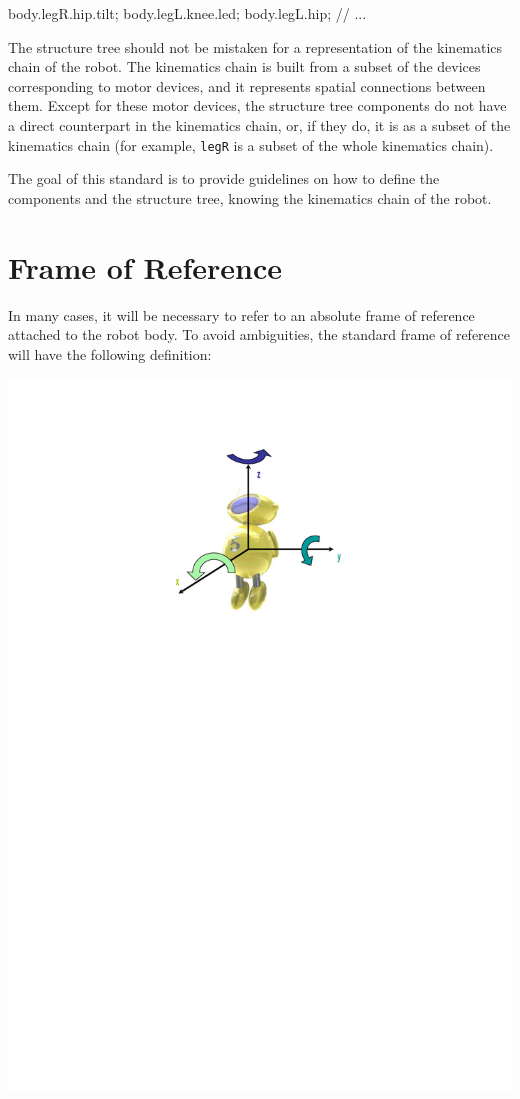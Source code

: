 \begin{urbifixme}
body.legR.hip.tilt;
body.legL.knee.led;
body.legL.hip;
// ...
\end{urbifixme}


The structure tree should not be mistaken for a representation of the
kinematics chain of the robot. The kinematics chain is built from a
subset of the devices corresponding to motor devices, and it represents
spatial connections between them. Except for these motor devices, the
structure tree components do not have a direct counterpart in the
kinematics chain, or, if they do, it is as a subset of the kinematics
chain (for example, \texttt{legR} is a subset of the whole kinematics
chain).


The goal of this standard is to provide guidelines on how to define the
components and the structure tree, knowing the kinematics chain of the
robot.

\section{Frame of Reference}

In many cases, it will be necessary to refer to an absolute frame of
reference attached to the robot body. To avoid ambiguities, the
standard frame of reference will have the following definition:

\begin{center}
  \includegraphics{img/reference-frame}
\end{center}

